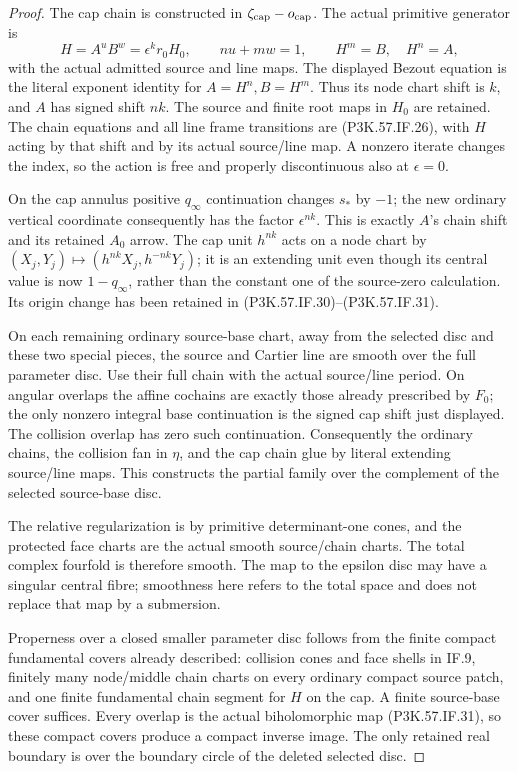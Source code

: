 \begin{proof}
The cap chain is constructed in \(\zeta_{\rm cap}-o_{\rm cap}\).
The actual primitive generator is
\[
 H=A^uB^w=\epsilon^k r_0H_0,\qquad nu+mw=1,
 \qquad H^m=B,\quad H^n=A ,
\]
with the actual admitted source and line maps. The displayed Bezout
equation is the literal exponent identity for \(A=H^n,B=H^m\).
Thus its node chart shift is
\(k\), and \(A\) has signed shift \(nk\). The source and finite
root maps in \(H_0\) are retained. The chain equations and all line
frame transitions are (P3K.57.IF.26), with \(H\) acting by that shift and
by its actual source/line map. A nonzero iterate changes the index,
so the action is free and properly discontinuous also at
\(\epsilon=0\).

On the cap annulus positive \(q_\infty\) continuation changes
\(s_*\) by \(-1\); the new ordinary vertical coordinate consequently
has the factor \(\epsilon^{nk}\). This is exactly \(A\)'s chain
shift and its retained \(A_0\) arrow. The cap unit \(h^{nk}\) acts
on a node chart by
\((X_j,Y_j)\mapsto(h^{nk}X_j,h^{-nk}Y_j)\); it is an extending
unit even though its central value is now \(1-q_\infty\), rather
than the constant one of the source-zero calculation. Its origin
change has been retained in (P3K.57.IF.30)--\allowbreak (P3K.57.IF.31).

On each remaining ordinary source-base chart, away from the selected
disc and these two special pieces, the source and Cartier line are
smooth over the full parameter disc. Use their full chain with the
actual source/line period. On angular overlaps the affine cochains
are exactly those already prescribed by \(F_0\); the only nonzero
integral base continuation is the signed cap shift just displayed.
The collision overlap has zero such continuation. Consequently
the ordinary chains, the collision fan in \(\eta\), and the cap
chain glue by literal extending source/line maps. This constructs
the partial family over the complement of the selected source-base
disc.

The relative regularization is by primitive determinant-one cones,
and the protected face charts are the actual smooth source/chain
charts. The total complex fourfold is therefore smooth. The map
to the epsilon disc may have a singular central fibre; smoothness
here refers to the total space and does not replace that map by a
submersion.

Properness over a closed smaller parameter disc follows from the
finite compact fundamental covers already described: collision
cones and face shells in IF.9, finitely many node/middle chain
charts on every ordinary compact source patch, and one finite
fundamental chain segment for \(H\) on the cap. A finite source-base
cover suffices. Every overlap is the actual biholomorphic map
(P3K.57.IF.31), so these compact covers produce a compact inverse image.
The only retained real boundary is over the boundary circle of the
deleted selected disc.


\end{proof}
